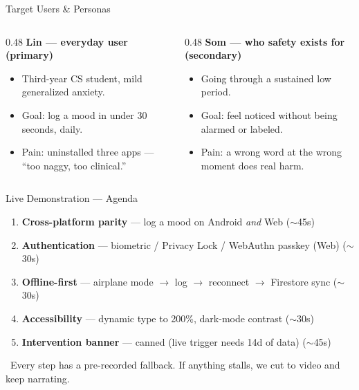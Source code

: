 \documentclass[aspectratio=169,11pt]{beamer}
\providecommand{\faExclamationTriangle}{}
\begin{document}
\begin{frame}{Target Users \& Personas}
\begin{columns}[T,onlytextwidth]
  \begin{column}{0.48\textwidth}
    \textbf{\color{moodgreen}Lin --- everyday user (primary)}
    \begin{itemize}\small
      \item Third-year CS student, mild generalized anxiety.
      \item Goal: log a mood in under 30 seconds, daily.
      \item Pain: uninstalled three apps --- ``too naggy, too clinical.''
    \end{itemize}
  \end{column}
  \begin{column}{0.48\textwidth}
    \textbf{\color{moodorange}Som --- who safety exists for (secondary)}
    \begin{itemize}\small
      \item Going through a sustained low period.
      \item Goal: feel noticed without being alarmed or labeled.
      \item Pain: a wrong word at the wrong moment does real harm.
    \end{itemize}
  \end{column}
\end{columns}
\vfill
{}
\end{frame}


\begin{frame}{Live Demonstration --- Agenda}
  \begin{enumerate}
    \item \textbf{Cross-platform parity} --- log a mood on Android \emph{and} Web \hfill {\footnotesize($\sim$45s)}
    \item \textbf{Authentication} --- biometric / Privacy Lock / WebAuthn passkey (Web) \hfill {\footnotesize($\sim$30s)}
    \item \textbf{Offline-first} --- airplane mode $\to$ log $\to$ reconnect $\to$ Firestore sync \hfill {\footnotesize($\sim$30s)}
    \item \textbf{Accessibility} --- dynamic type to 200\%, dark-mode contrast \hfill {\footnotesize($\sim$30s)}
    \item \textbf{Intervention banner} --- canned (live trigger needs 14d of data) \hfill {\footnotesize($\sim$45s)}
  \end{enumerate}
  {\footnotesize\color{moodred}\faExclamationTriangle\ Every step has a pre-recorded fallback. If anything stalls, we cut to video and keep narrating.}
\end{frame}
\end{document}
